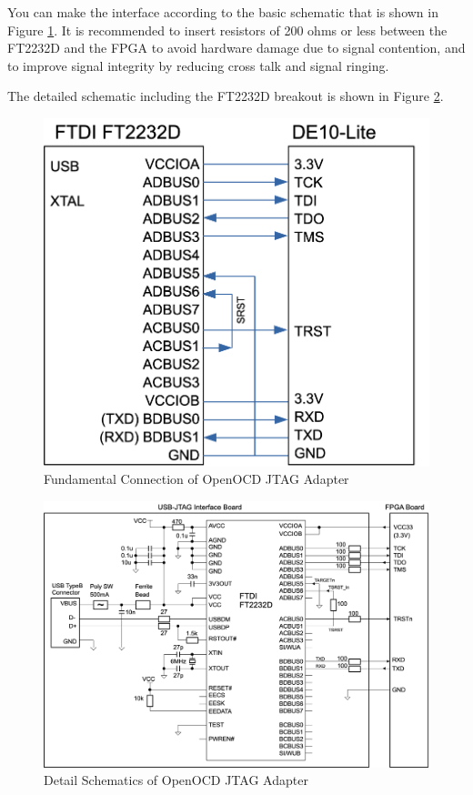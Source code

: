 You can make the interface according to the basic schematic that is shown in Figure \ref{fig:USBJTAGFUNDAMENTAL}. It is recommended to insert resistors of 200 ohms or less between the FT2232D and the FPGA to avoid hardware damage due to signal contention, and to improve signal integrity by reducing cross talk and signal ringing.

The detailed schematic including the FT2232D breakout is shown in Figure \ref{fig:USBJTAGSCHEMATICS}.

\begin{figure}[H]
    \includegraphics[width=0.75\columnwidth]{./Figure/USB_JTAG_Fundamental.png}
    \caption{Fundamental Connection of OpenOCD JTAG Adapter}
    \label{fig:USBJTAGFUNDAMENTAL}
\end{figure}

\begin{figure}[H]
    \includegraphics[width=1.0\columnwidth]{./Figure/USB_JTAG_Schematics.png}
    \caption{Detail Schematics of OpenOCD JTAG Adapter}
    \label{fig:USBJTAGSCHEMATICS}
\end{figure}

